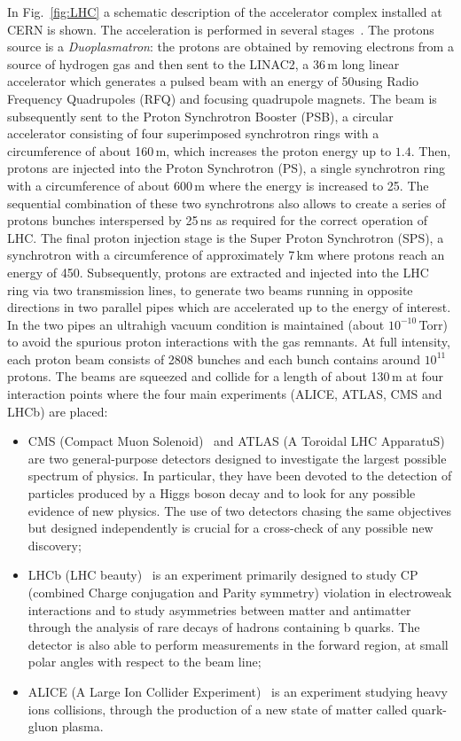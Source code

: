 In Fig.~\ref{fig:LHC} a schematic description of the accelerator complex installed at CERN is shown.
The acceleration is performed in several stages~\cite{Benedikt:823808}. The protons source is a \emph{Duoplasmatron}: the protons are obtained by removing electrons from a source of hydrogen gas and then sent to the LINAC2, a 36\,m long linear accelerator which generates a pulsed beam with an energy of 50\MeV using Radio Frequency Quadrupoles (RFQ) and focusing quadrupole magnets. The beam is subsequently sent to the Proton Synchrotron Booster (PSB), a circular accelerator consisting of four superimposed synchrotron rings with a circumference of about 160\,m, which increases the proton energy up to $1.4$\GeV. Then, protons are injected into the Proton Synchrotron (PS), a single synchrotron ring with a circumference of about 600\,m where the energy is increased to 25\GeV. The sequential combination of these two synchrotrons also allows to create a series of protons bunches
interspersed by 25\,ns as required for the correct operation of LHC. The final proton injection stage is the Super Proton Synchrotron (SPS), a synchrotron with a circumference of approximately 7\,km where protons reach an energy of 450\GeV. Subsequently, protons are extracted and injected into the LHC ring via two transmission lines, to generate two beams running in opposite directions in two parallel pipes which are accelerated up to the energy of interest. In the two pipes an ultrahigh vacuum condition is maintained (about $10^{-10}$\,Torr) to avoid the spurious proton interactions with the gas remnants. At full intensity, each proton beam consists of 2808 bunches and each bunch contains around $10^{11}$ protons. The beams are squeezed and collide for a length of about 130\,m at four interaction points where the four main experiments (ALICE, ATLAS, CMS and LHCb) are placed:
\begin{itemize}
\item CMS (Compact Muon Solenoid)~\cite{Chatrchyan:2008aa} and ATLAS (A Toroidal LHC ApparatuS)~\cite{Aad:2008zzm} are two general-purpose detectors designed to investigate the largest possible spectrum of physics. In particular, they have been devoted to the detection of particles produced by a Higgs boson decay and to look for any possible evidence of new physics. The use of two detectors chasing the same objectives but designed independently is crucial for a cross-check of any possible new discovery;
\item LHCb (LHC beauty)~\cite{Alves:2008zz} is an experiment primarily designed to study CP (combined Charge conjugation and Parity symmetry) violation in electroweak interactions and to study asymmetries between matter and antimatter through the analysis of rare decays of hadrons containing b quarks. The detector is also able to perform measurements in the forward region, at small polar angles with respect to the beam line;
\item ALICE (A Large Ion Collider Experiment)~\cite{Aamodt:2008zz} is an experiment studying heavy ions collisions, through the production of a new state of matter called quark-gluon plasma.
\end{itemize}

